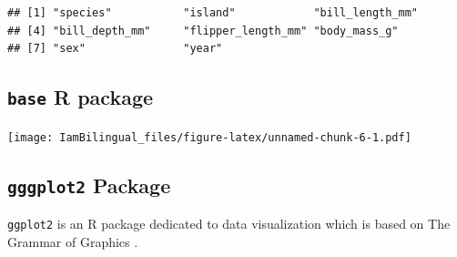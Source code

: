 \documentclass[]{book}
\newenvironment{Shaded}{\begin{snugshade}}{\end{snugshade}}
\newcommand{\CommentTok}[1]{\textcolor[rgb]{0.56,0.35,0.01}{\textit{#1}}}
\newcommand{\DataTypeTok}[1]{\textcolor[rgb]{0.13,0.29,0.53}{#1}}
\newcommand{\DecValTok}[1]{\textcolor[rgb]{0.00,0.00,0.81}{#1}}
\newcommand{\KeywordTok}[1]{\textcolor[rgb]{0.13,0.29,0.53}{\textbf{#1}}}
\newcommand{\NormalTok}[1]{#1}
\newcommand{\OperatorTok}[1]{\textcolor[rgb]{0.81,0.36,0.00}{\textbf{#1}}}
\newcommand{\StringTok}[1]{\textcolor[rgb]{0.31,0.60,0.02}{#1}}
\begin{document}
\begin{verbatim}
## [1] "species"           "island"            "bill_length_mm"   
## [4] "bill_depth_mm"     "flipper_length_mm" "body_mass_g"      
## [7] "sex"               "year"
\end{verbatim}

\hypertarget{base-r-package}{%
\subsection{\texorpdfstring{\texttt{base} R package}{base R package}}\label{base-r-package}}

\begin{Shaded}
\end{Shaded}

\texttt{[image: IamBilingual\_files/figure-latex/unnamed-chunk-6-1.pdf]}

\hypertarget{gggplot2-package}{%
\subsection{\texorpdfstring{\texttt{gggplot2} Package}{gggplot2 Package}}\label{gggplot2-package}}

\texttt{ggplot2} is an R package dedicated to data visualization which is based on The Grammar of Graphics \citep{wilkinson2012grammar}.
\end{document}
